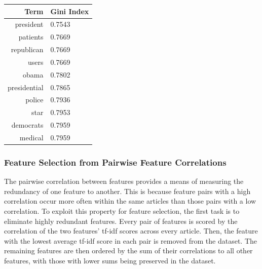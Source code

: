 \documentclass[11pt]{article}
\begin{document}
\begin{center}
\begin{tabular}{ |r|l| } 
 \hline
 Term & Gini Index \\
 \hline
president &     0.7543 \\
patients &      0.7669 \\
republican &    0.7669 \\
users &         0.7669 \\
obama &         0.7802 \\
presidential &  0.7865 \\
police &        0.7936 \\
star &          0.7953 \\
democrats &     0.7959 \\
medical &       0.7959 \\
 \hline
\end{tabular}
\end{center}


\subsubsection{Feature Selection from Pairwise Feature Correlations}

The pairwise correlation between features provides a means of measuring the redundancy of one feature to another.
This is because feature pairs with a high correlation occur more often within the same articles than those pairs with a low correlation.
To exploit this property for feature selection, the first task is to eliminate highly redundant features.
Every pair of features is scored by the correlation of the two features' tf-idf scores across every article.
Then, the feature with the lowest average tf-idf score in each pair is removed from the dataset.
The remaining features are then ordered by the sum of their correlations to all other features, with those with lower sums being preserved in the dataset.

\end{document}
